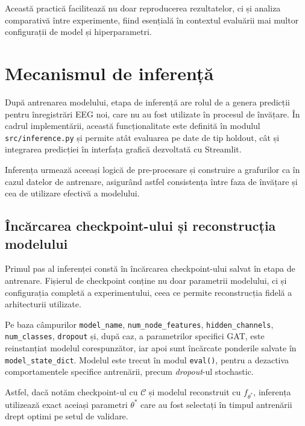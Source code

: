 \documentclass[12pt,a4paper]{report}
\theoremstyle{definition}
\theoremstyle{remark}
\begin{document}
Această practică facilitează nu doar reproducerea rezultatelor, ci și analiza comparativă între experimente, fiind esențială în contextul evaluării mai multor configurații de model și hiperparametri.

\section{Mecanismul de inferență}

După antrenarea modelului, etapa de inferență are rolul de a genera predicții pentru înregistrări EEG noi, care nu au fost utilizate în procesul de învățare. În cadrul implementării, această funcționalitate este definită în modulul \texttt{src/inference.py} și permite atât evaluarea pe date de tip holdout, cât și integrarea predicției în interfața grafică dezvoltată cu Streamlit.

Inferența urmează aceeași logică de pre-procesare și construire a grafurilor ca în cazul datelor de antrenare, asigurând astfel consistența între faza de învățare și cea de utilizare efectivă a modelului.

\subsection{Încărcarea checkpoint-ului și reconstrucția modelului}

Primul pas al inferenței constă în încărcarea checkpoint-ului salvat în etapa de antrenare. Fișierul de checkpoint conține nu doar parametrii modelului, ci și configurația completă a experimentului, ceea ce permite reconstrucția fidelă a arhitecturii utilizate.

Pe baza câmpurilor \texttt{model\_name}, \texttt{num\_node\_features}, \texttt{hidden\_channels}, \texttt{num\_classes}, \texttt{dropout} și, după caz, a parametrilor specifici GAT, este reinstanțiat modelul corespunzător, iar apoi sunt încărcate ponderile salvate în \texttt{model\_state\_dict}. Modelul este trecut în modul \texttt{eval()}, pentru a dezactiva comportamentele specifice antrenării, precum \textit{dropout}-ul stochastic.

Astfel, dacă notăm checkpoint-ul cu $\mathcal{C}$ și modelul reconstruit cu $f_{\theta^*}$, inferența utilizează exact aceiași parametri $\theta^*$ care au fost selectați în timpul antrenării drept optimi pe setul de validare.
\end{document}
